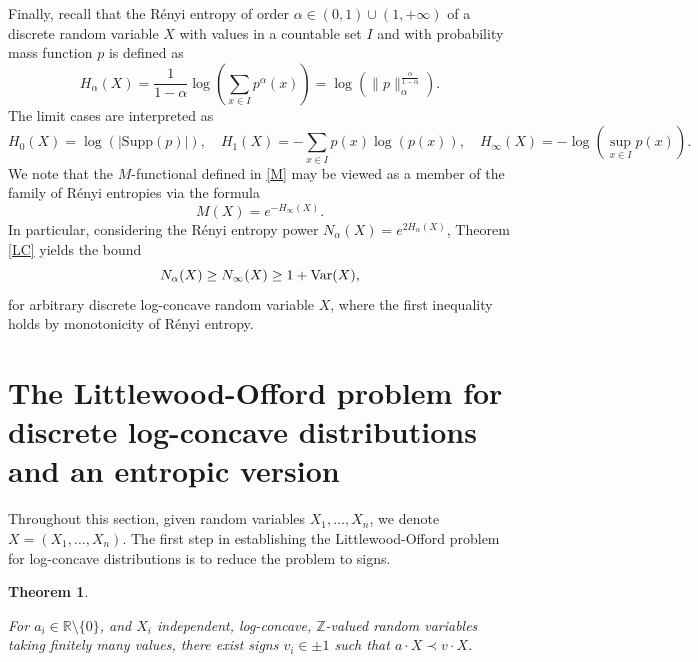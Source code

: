 \documentclass[11pt]{article}
\newtheorem{thm}{Theorem}[section]
\newcommand{\supp}{\mathrm{Supp}}
\DeclareMathOperator{\Var}{Var}
\newcommand{\1}{[1]}
\def\Var{{\rm Var}}
\begin{document}
Finally, recall that the R\'enyi entropy of order $\alpha \in (0,1) \cup (1, +\infty)$ of a discrete random variable $X$ with values in a countable set $I$ and with probability mass function $p$ is defined as
$$ H_{\alpha}(X) = \frac{1}{1-\alpha} \log \left( \sum_{x \in I} p^{\alpha}(x) \right) = \log(\|p\|_{\alpha}^{\frac{\alpha}{1-\alpha}}). $$
The limit cases are interpreted as
$$ H_0(X) = \log(|\supp(p)|), \quad H_1(X) = -\sum_{x \in I} p(x) \log(p(x)), \quad H_{\infty}(X) = -\log(\sup_{x \in I} p(x)). $$
We note that the $M$-functional defined in \eqref{M} may be viewed as a member of the family of R\'enyi entropies via the formula
\begin{equation}\label{member}
M(X) = e^{-H_{\infty}(X)}.
\end{equation}
In particular, considering the R\'enyi entropy power $N_{\alpha}(X) = e^{2H_{\alpha}(X)}$, Theorem \ref{LC} yields the bound
\begin{equation}\label{entropy}
N_{\alpha}(X) \geq N_{\infty}(X) \geq 1 + \Var(X),
\end{equation}
for arbitrary discrete log-concave random variable $X$, where the first inequality holds by monotonicity of R\'enyi entropy. 




\section{The Littlewood-Offord problem for discrete log-concave distributions and an entropic version}\label{2}

Throughout this section, given random variables $X_1, \dots, X_n$, we denote $X=(X_1, \dots,X_n)$. The first step in establishing the Littlewood-Offord problem for log-concave distributions is to reduce the problem to signs.


\begin{thm}\label{thm: majorization by signs}

For $a_i \in \mathbb{R} \setminus \{0\}$, and $X_i$ independent, log-concave, $\mathbb{Z}$-valued random variables taking finitely many values, there exist signs $v_i \in \pm 1$ such that $a \cdot X \prec v \cdot X$.

\end{thm}
\end{document}
